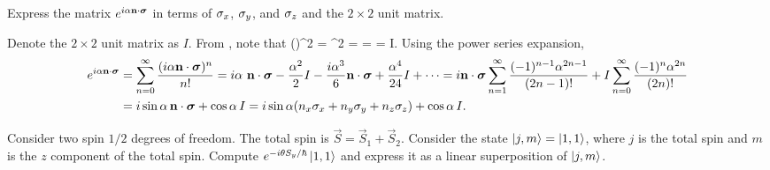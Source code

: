 \begin{problem} \label{2.2}
	Express the matrix $e^{i \alpha \mathbf{n} \cdot \boldsymbol{\sigma}}$ in terms of $\sigma_x$, $\sigma_y$, and $\sigma_z$ and the $2 \times 2$ unit matrix.
\end{problem}

\begin{solution}
	Denote the $2 \times 2$ unit matrix as $I$.  From , note that
	\beqn \label{paulisq}
		(\nds)^2 = \mqty[ \nz & \nx - i \ny \\ \nx + i \ny & -\nz ]^2
		= \mqty[ \nx^2 + \ny^2 + \nz^2 & (\nz - \nz) (\nx - i \ny) \\
				(\nz - \nz) (\nx + i \ny) & \nx^2 + \ny^2 + \nz^2]
		= \mqty[ 1 & 0 \\ 0 & 1 ]
		= I.
	\eeqn
	Using the power series expansion,
	\begin{align*}
		e^{i \alpha \mathbf{n} \cdot \boldsymbol{\sigma}} &= \sum_{n = 0}^\infty \frac{(i \alpha \mathbf{n} \cdot \boldsymbol{\sigma})^n}{n!}
		= i \alpha \ \mathbf{n} \cdot \boldsymbol{\sigma} - \frac{\alpha^2}{2} I - \frac{i \alpha^3}{6} \mathbf{n} \cdot \boldsymbol{\sigma} + \frac{\alpha^4}{24} I + \cdots
		= i \mathbf{n} \cdot \boldsymbol{\sigma} \sum_{n = 1}^\infty \frac{(-1)^{n-1} \alpha^{2n - 1}}{(2n - 1)!} + I \sum_{n = 0}^\infty \frac{(-1)^n \alpha^{2n}}{(2n)!} \\
		&= i \sin{\alpha} \, \mathbf{n} \cdot \boldsymbol{\sigma} + \cos{\alpha} \, I = i \sin{\alpha} (n_x \sigma_x + n_y \sigma_y + n_z \sigma_z) + \cos{\alpha} \, I.
	\end{align*}
\vfix
\end{solution}

\newcommand{\Sy}{S_y}
\newcommand{\Sz}{S_z}
\newcommand{\vS}{\vec{S}}
\newcommand{\vSq}{\vS_1}
\newcommand{\vSw}{\vS_2}
\newcommand{\eitsyh}{e^{-i \tht \Sy / \hbar}}

\newcommand{\kjm}{\ket{j, m}}
\newcommand{\kqq}{\ket{1, 1}}
\newcommand{\koo}{\ket{0, 0}}
\newcommand{\kqo}{\ket{1, 0}}
\newcommand{\kqnq}{\ket{1, -1}}

\newcommand{\Syq}{{\Sy}_1}
\newcommand{\Syw}{{\Sy}_2}
\newcommand{\sz}{s_z}
\newcommand{\ksz}{\ket{\sz}}
\newcommand{\szq}{{\sz}_1}
\newcommand{\szw}{{\sz}_2}
\newcommand{\kszsz}{\ket{\szq \, \szw}}

\newcommand{\up}{\uparrow}
\newcommand{\dn}{\downarrow}
\newcommand{\kuu}{\ket{\up \up}}
\newcommand{\kdd}{\ket{\dn \dn}}
\newcommand{\kud}{\ket{\up \dn}}
\newcommand{\kdu}{\ket{\dn \up}}

\begin{problem}
	Consider two spin $1/2$ degrees of freedom.  The total spin is $\vS = \vSq + \vSw$.  Consider the state $\kjm = \kqq$, where $j$ is the total spin and $m$ is the $z$ component of the total spin.  Compute $\eitsyh \kqq$ and express it as a linear superposition of $\kjm$.
\end{problem}

